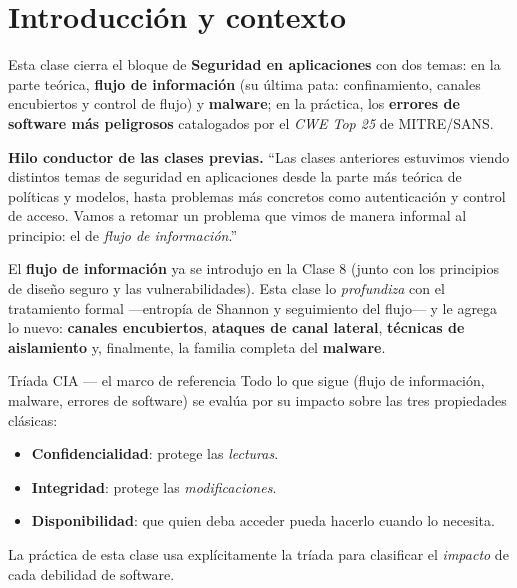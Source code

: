 \documentclass[11pt,a4paper]{article}
\begin{document}
\tableofcontents
\newpage

\section{Introducción y contexto}

Esta clase cierra el bloque de \textbf{Seguridad en aplicaciones} con dos temas: en la
parte teórica, \textbf{flujo de información} (su última pata: confinamiento, canales
encubiertos y control de flujo) y \textbf{malware}; en la práctica, los \textbf{errores de
software más peligrosos} catalogados por el \emph{CWE Top 25} de MITRE/SANS.

\begin{slidebox}
\textbf{Hilo conductor de las clases previas.} ``Las clases anteriores estuvimos viendo
distintos temas de seguridad en aplicaciones desde la parte más teórica de políticas y
modelos, hasta problemas más concretos como autenticación y control de acceso. Vamos a
retomar un problema que vimos de manera informal al principio: el de \emph{flujo de
información}.''
\end{slidebox}

El \textbf{flujo de información} ya se introdujo en la Clase 8 (junto con los principios de
diseño seguro y las vulnerabilidades). Esta clase lo \emph{profundiza} con el tratamiento
formal —entropía de Shannon y seguimiento del flujo— y le agrega lo nuevo: \textbf{canales
encubiertos}, \textbf{ataques de canal lateral}, \textbf{técnicas de aislamiento} y, finalmente,
la familia completa del \textbf{malware}.

\begin{defbox}{Tríada CIA — el marco de referencia}
Todo lo que sigue (flujo de información, malware, errores de software) se evalúa por su
impacto sobre las tres propiedades clásicas:
\begin{itemize}[leftmargin=1.4em,itemsep=2pt]
  \item \textbf{Confidencialidad}: protege las \emph{lecturas}.
  \item \textbf{Integridad}: protege las \emph{modificaciones}.
  \item \textbf{Disponibilidad}: que quien deba acceder pueda hacerlo cuando lo necesita.
\end{itemize}
La práctica de esta clase usa explícitamente la tríada para clasificar el \emph{impacto} de
cada debilidad de software.
\end{defbox}
\end{document}
